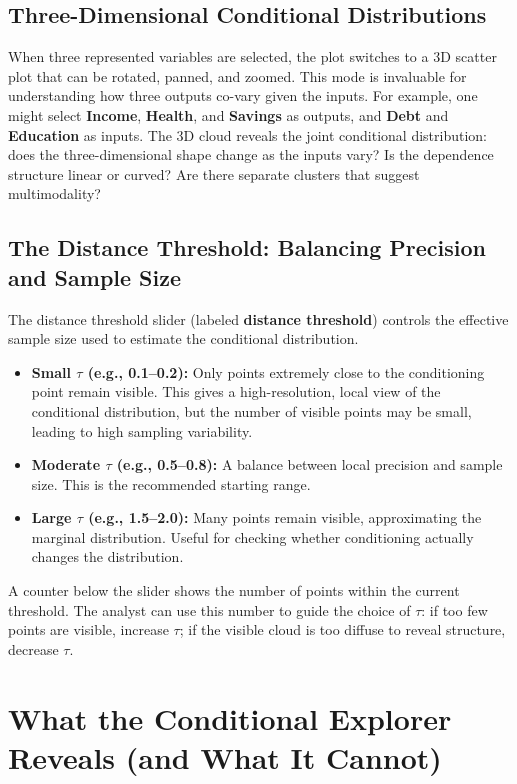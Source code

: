 \subsection{Three-Dimensional Conditional Distributions}

When three represented variables are selected, the plot switches to a 3D scatter plot that can be rotated, panned, and zoomed. This mode is invaluable for understanding how three outputs co-vary given the inputs. For example, one might select \textbf{Income}, \textbf{Health}, and \textbf{Savings} as outputs, and \textbf{Debt} and \textbf{Education} as inputs. The 3D cloud reveals the joint conditional distribution: does the three-dimensional shape change as the inputs vary? Is the dependence structure linear or curved? Are there separate clusters that suggest multimodality?

\subsection{The Distance Threshold: Balancing Precision and Sample Size}

The distance threshold slider (labeled \textbf{distance threshold}) controls the effective sample size used to estimate the conditional distribution.

\begin{itemize}
    \item \textbf{Small \(\tau\) (e.g., 0.1–0.2):} Only points extremely close to the conditioning point remain visible. This gives a high-resolution, local view of the conditional distribution, but the number of visible points may be small, leading to high sampling variability.
    \item \textbf{Moderate \(\tau\) (e.g., 0.5–0.8):} A balance between local precision and sample size. This is the recommended starting range.
    \item \textbf{Large \(\tau\) (e.g., 1.5–2.0):} Many points remain visible, approximating the marginal distribution. Useful for checking whether conditioning actually changes the distribution.
\end{itemize}

A counter below the slider shows the number of points within the current threshold. The analyst can use this number to guide the choice of \(\tau\): if too few points are visible, increase \(\tau\); if the visible cloud is too diffuse to reveal structure, decrease \(\tau\).

\section{What the Conditional Explorer Reveals (and What It Cannot)}

